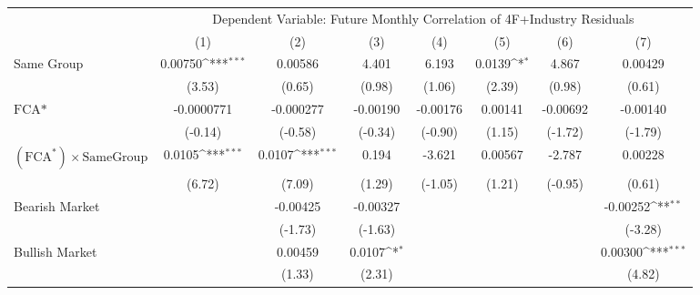 {
\def\sym#1{\ifmmode^{#1}\else\(^{#1}\)\fi}
\begin{tabular}{l*{7}{c}}
\hline\hline
                &\multicolumn{7}{c}{Dependent Variable: Future Monthly Correlation of 4F+Industry Residuals}                                         \\\cmidrule(lr){2-8}
                &\multicolumn{1}{c}{(1)}         &\multicolumn{1}{c}{(2)}         &\multicolumn{1}{c}{(3)}         &\multicolumn{1}{c}{(4)}         &\multicolumn{1}{c}{(5)}         &\multicolumn{1}{c}{(6)}         &\multicolumn{1}{c}{(7)}         \\
\hline
Same Group      &  0.00750\sym{***}&  0.00586         &    4.401         &    6.193         &   0.0139\sym{*}  &    4.867         &  0.00429         \\
                &   (3.53)         &   (0.65)         &   (0.98)         &   (1.06)         &   (2.39)         &   (0.98)         &   (0.61)         \\
[1em]
$ \text{FCA*} $ &-0.0000771         &-0.000277         & -0.00190         & -0.00176         &  0.00141         & -0.00692         & -0.00140         \\
                &  (-0.14)         &  (-0.58)         &  (-0.34)         &  (-0.90)         &   (1.15)         &  (-1.72)         &  (-1.79)         \\
[1em]
 $ (\text{FCA}^*) \times {\text{SameGroup} }  $ &   0.0105\sym{***}&   0.0107\sym{***}&    0.194         &   -3.621         &  0.00567         &   -2.787         &  0.00228         \\
                &   (6.72)         &   (7.09)         &   (1.29)         &  (-1.05)         &   (1.21)         &  (-0.95)         &   (0.61)         \\
[1em]
Bearish Market  &                  & -0.00425         & -0.00327         &                  &                  &                  & -0.00252\sym{**} \\
                &                  &  (-1.73)         &  (-1.63)         &                  &                  &                  &  (-3.28)         \\
[1em]
Bullish Market  &                  &  0.00459         &   0.0107\sym{*}  &                  &                  &                  &  0.00300\sym{***}\\
                &                  &   (1.33)         &   (2.31)         &                  &                  &                  &   (4.82)         \\

\end{tabular}}
